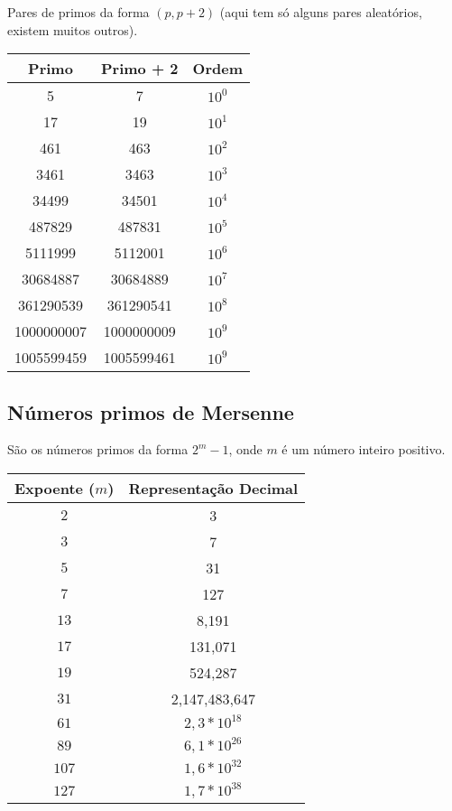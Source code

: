 \documentclass[10pt, a4paper, oneside]{book}
\begin{document}
Pares de primos da forma $(p, p + 2)$ (aqui tem só alguns pares aleatórios, existem muitos outros).

\begin{table}[h]
  \centering
  \begin{tabular}{|c|c|c|}
    \hline
    \textbf{Primo} & \textbf{Primo + 2} & \textbf{Ordem} \\
    \hline
    5 & 7 & $10^0$ \\
    \hline
    17 & 19 & $10^1$ \\
    \hline
    461 & 463 & $10^2$ \\
    \hline
    3461 & 3463 & $10^3$ \\
    \hline
    34499 & 34501 & $10^4$ \\
    \hline
    487829 & 487831 & $10^5$ \\
    \hline
    5111999 & 5112001 & $10^6$ \\
    \hline
    30684887 & 30684889 & $10^7$ \\
    \hline
    361290539 & 361290541 & $10^8$ \\
    \hline
    1000000007 & 1000000009 & $10^9$ \\
    \hline
    1005599459 & 1005599461 & $10^9$ \\
    \hline
  \end{tabular}
\end{table}


\subsection{Números primos de Mersenne}

São os números primos da forma $2^m - 1$, onde $m$ é um número inteiro positivo.

\begin{table}[h]
  \centering
  \begin{tabular}{|c|c|}
    \hline
    \textbf{Expoente ($m$)} & \textbf{Representação Decimal} \\
    \hline
    \(2\) & 3 \\
    \hline
    \(3\) & 7 \\
    \hline
    \(5\) & 31 \\
    \hline
    \(7\) & 127 \\
    \hline
    \(13\) & 8,191 \\
    \hline
    \(17\) & 131,071 \\
    \hline
    \(19\) & 524,287 \\
    \hline
    \(31\) & 2,147,483,647 \\
    \hline
    \(61\) & $2,3 * 10^{18}$ \\
    \hline
    \(89\) & $6,1 * 10^{26}$ \\
    \hline
    \(107\) & $1,6 * 10^{32}$ \\
    \hline
    \(127\) & $1,7 * 10^{38}$ \\
    \hline
  \end{tabular}
\end{table}
\end{document}
